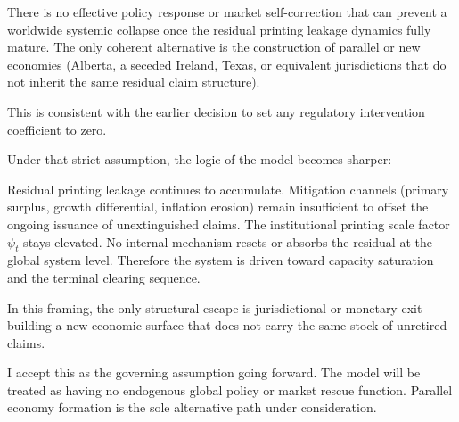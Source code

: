 There is no effective policy response or market self-correction that can prevent a worldwide systemic collapse once the residual printing leakage dynamics fully mature.
The only coherent alternative is the construction of parallel or new economies (Alberta, a seceded Ireland, Texas, or equivalent jurisdictions that do not inherit the same residual claim structure).

This is consistent with the earlier decision to set any regulatory intervention coefficient to zero.

Under that strict assumption, the logic of the model becomes sharper:

Residual printing leakage continues to accumulate.
Mitigation channels (primary surplus, growth differential, inflation erosion) remain insufficient to offset the ongoing issuance of unextinguished claims.
The institutional printing scale factor \(\psi_t\) stays elevated.
No internal mechanism resets or absorbs the residual at the global system level.
Therefore the system is driven toward capacity saturation and the terminal clearing sequence.

In this framing, the only structural escape is jurisdictional or monetary exit — building a new economic surface that does not carry the same stock of unretired claims.

I accept this as the governing assumption going forward. The model will be treated as having no endogenous global policy or market rescue function. Parallel economy formation is the sole alternative path under consideration.
